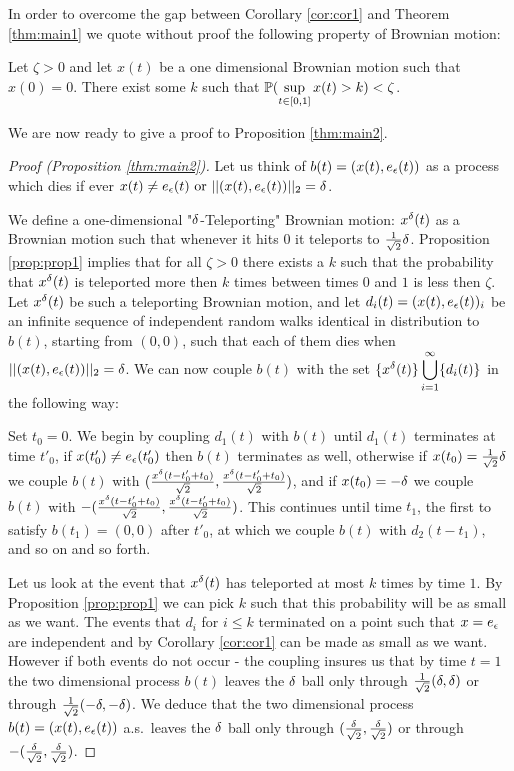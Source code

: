 {In order to overcome the gap between Corollary \ref{cor:cor1} and
Theorem \ref{thm:main1} we quote without proof the following property of Brownian
motion:
\begin{propos}\label{prop:prop1}
Let $\zeta>0$ and let $x(t)$ be a one dimensional Brownian
motion such that $x(0)=0$. There exist some $k$ such that
$\mathbb{P}(\displaystyle\sup_{t\in[0,1]}x(t)>k) <\zeta$.
\end{propos}

We are now ready to give a proof to Proposition \ref{thm:main2}.

\begin{proof}[Proof (Proposition \ref{thm:main2})]
\newcommand{\hitradius}[1]{\twonorm{\twodproc{#1}}=\radius}

Let us think of $b(t)=(x(t), e_\epsilon(t))$ as a process which dies if ever $x(t)\neq e_\epsilon(t)
\text{ or } ||(x(t), e_\epsilon(t))||_2 = \delta$.

We define a one-dimensional "$\delta$-Teleporting" Brownian motion: $x^{\delta}(t)$
 as a Brownian motion such that whenever it hits $0$ it teleports to $\frac1{\sqrt{2}}\delta$.
Proposition \ref{prop:prop1} implies that for all $\zeta>0$ there exists a $k$ such that the probability
that $x^{\delta}(t)$ is teleported more then $k$ times between times $0$ and $1$ is less then $\zeta$. Let $x^{\delta}(t)$ be such a teleporting Brownian motion, and let
 $d_i(t)=(x(t), e_\epsilon(t))_i$ be an infinite sequence
 of independent random walks identical in distribution to $b(t)$, starting from $(0,0)$, such that each
 of them dies when $||(x(t), e_\epsilon(t))||_2 = \delta$. We can now couple $b(t)$ with the set $\{x^\delta(t)\}\displaystyle\bigcup_{i=1}^\infty\{d_i(t)\}$ in the following way:

Set $t_0=0$. We begin by coupling $d_1(t)$ with $b(t)$ until $d_1(t)$ terminates at 
time $t'_0$, if $x(t'_0)\neq e_\epsilon(t'_0)$ then $b(t)$ terminates as well, otherwise
 if $x(t_0)=\frac1{\sqrt{2}}\delta$ we couple $b(t)$ with $(\frac{x^\delta(t-t'_0+t_0)}{\sqrt{2}},\frac{x^\delta(t-t'_0+t_0)}{\sqrt{2}})$,
  and if $x(t_0)=-\delta$ we couple $b(t)$ with $-(\frac{x^\delta(t-t'_0+t_0)}{\sqrt{2}},\frac{x^\delta(t-t'_0+t_0)}{\sqrt{2}})$.
 This continues until time $t_1$, the first to satisfy $b(t_1)=(0,0)$ after $t'_0$, 
 at which we couple $b(t)$ with $d_2(t-t_1)$, and so on and so forth.

Let us look at the event that $x^\delta(t)$ has teleported at most $k$ times by time $1$.
 By Proposition \ref{prop:prop1} we can pick $k$ such that this probability will be as small 
 as we want. The events that $d_i$ for $i\le k$ terminated on a point such that $x=e_\epsilon$ 
 are independent and by Corollary \ref{cor:cor1} can be made as small as we want. However
  if both events do not occur - the coupling insures us that by time $t=1$ the two
   dimensional process $b(t)$
leaves the $\delta$ ball only through
$\frac1{\sqrt2}(\delta,\delta)$ or through
$\frac1{\sqrt2}(-\delta,-\delta)$. We deduce that the two dimensional process $b(t)=(x(t), e_\epsilon(t))$
a.s.\ leaves the $\delta$ ball only through $(\frac{\delta}{\sqrt2},\frac{\delta}{\sqrt2})$ or through $-(\frac{\delta}{\sqrt2},\frac{\delta}{\sqrt2})$.


\end{proof}}
